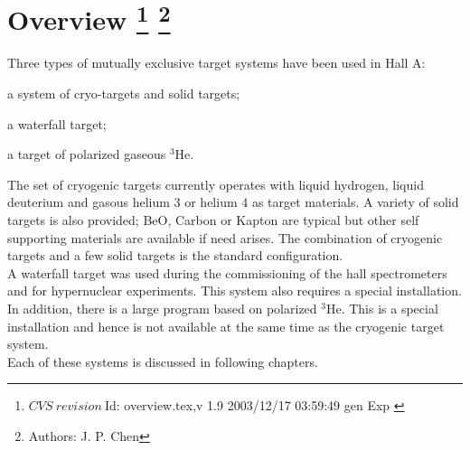 \chapter[Overview]{ Overview
\footnote{
  $CVS~revision~ $Id: overview.tex,v 1.9 2003/12/17 03:59:49 gen Exp $ $ }
\footnote{Authors: J. P. Chen }
}
\label{sec:targets-overv}

Three types of mutually exclusive target systems have been used in Hall A:

\begin{list}{.~}{\setlength{\itemsep}{-0.15cm}}
  \item a system of cryo-targets and solid targets;
  \item a waterfall target;
  \item a target of polarized gaseous $^3$He.
\end{list}

The set of
cryogenic targets currently operates with liquid hydrogen, liquid
deuterium and gasous helium 3 or helium 4
as target materials.
A variety of solid targets is also provided; BeO, Carbon or
Kapton are typical but other self supporting materials are available if need arises.
The combination of cryogenic targets and a few solid targets is
the standard configuration. \\

A waterfall target was used during the commissioning of
the hall spectrometers and for hypernuclear experiments. This system also 
requires a special installation. \\

In addition,
there is a large program based on polarized $^3$He. This
is a special installation and hence is not available at the same
time as the cryogenic target system.\\

Each of these systems is discussed in following chapters.
%
%
%
%
%
%
%
%
%

